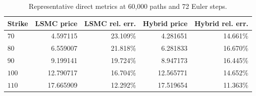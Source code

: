 \begin{table}[htbp]
\centering
\caption{Representative direct metrics at 60,000 paths and 72 Euler steps.}
\label{tab:bgk_r05_v0114_vp009_t1_delta05_nex12-step72-60k}
\begin{tabular}{lrrrr}
\toprule
Strike & LSMC price & LSMC rel. err. & Hybrid price & Hybrid rel. err. \\
\midrule
$70$ & 4.597115 & 23.109\% & 4.281651 & 14.661\% \\
$80$ & 6.559007 & 21.818\% & 6.281833 & 16.670\% \\
$90$ & 9.199141 & 19.724\% & 8.947173 & 16.445\% \\
$100$ & 12.790717 & 16.704\% & 12.565771 & 14.652\% \\
$110$ & 17.665909 & 12.292\% & 17.519654 & 11.363\% \\
\bottomrule
\end{tabular}
\end{table}
